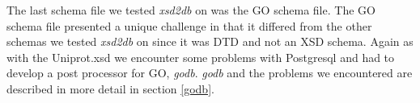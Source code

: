 The last schema file we tested \emph{xsd2db} on was the GO schema file.  The GO schema file presented a unique challenge in that it differed from the other schemas we tested \emph{xsd2db} on since it was DTD and not an XSD schema.  Again as with the Uniprot.xsd we encounter some problems with Postgresql and had to develop a post processor for GO, \emph{godb}.  \emph{godb} and the problems we encountered are described in more detail in section \ref{godb}.

     




